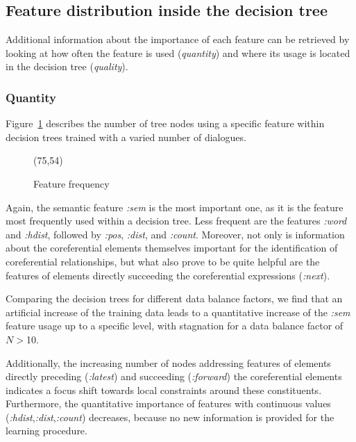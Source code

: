 \subsection{Feature distribution inside the decision tree}
\label{feature-dt}

Additional information about the importance of each feature can be retrieved by
looking at how often the feature is used ({\em quantity}) and where its usage is located
in the decision tree ({\em quality}).

\subsubsection{Quantity}

Figure~\ref{pic-feature-quantity} describes the number of tree nodes using a specific feature
within decision trees trained with a varied number of dialogues.
\begin{figure}[ht]
  \begin{center}
  \vspace*{-1\baselineskip}
\atari(75,54)
    \caption{Feature frequency}\label{pic-feature-quantity}
  \vspace*{-1\baselineskip}
  \end{center}
\end{figure}

Again, the semantic feature {\em :sem} is the most important one, as it is the feature most frequently
used within a decision tree. Less frequent are the features {\em :word} and {\em :hdist},
followed by {\em :pos}, {\em :dist}, and {\em :count}.
Moreover, not only is information about the coreferential elements themselves important
for the identification of coreferential relationships, but what also prove to be quite helpful are
the features of elements directly succeeding the coreferential expressions ({\em :next}).

Comparing the decision trees for different data balance factors, we find that an artificial increase
of the training data leads to a quantitative increase of the {\em :sem} feature usage up to
a specific level, with stagnation for a data balance factor of $N>$10.

Additionally, the increasing number of nodes addressing features of elements directly preceding ({\em :latest})
and succeeding ({\em :forward}) the coreferential elements indicates a focus shift towards
local constraints around these constituents.
Furthermore, the quantitative importance of features with continuous values ({\em :hdist},{\em :dist},{\em :count})
decreases, because no new information is provided for the learning procedure.

